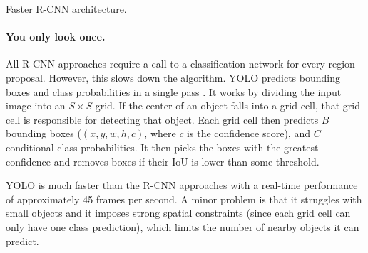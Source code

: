 \begin{marginfigure}[0.5cm]
    \centering
    \caption{Faster R-CNN architecture.}
    \label{fig:faster-r-cnn}
\end{marginfigure}

\paragraph{You only look once.}

All R-CNN approaches require a call to a classification network for every
region proposal. However, this slows down the algorithm. YOLO predicts bounding
boxes and class probabilities in a single pass \citep{redmon2016you}. It works
by dividing the input image into an $S\times S$ grid. If the center of an
object falls into a grid cell, that grid cell is responsible for detecting that
object. Each grid cell then predicts $B$ bounding boxes ($(x,y,w,h,c)$, where
$c$ is the confidence score), and $C$ conditional class
probabilities. It then picks the boxes with the greatest
confidence and removes boxes if their IoU is lower than some threshold.

YOLO is much faster than the R-CNN approaches with a real-time performance of
approximately 45 frames per second. A minor problem is that it struggles with
small objects and it imposes strong spatial constraints (since each grid cell
can only have one class prediction), which limits the number of nearby objects
it can predict.
